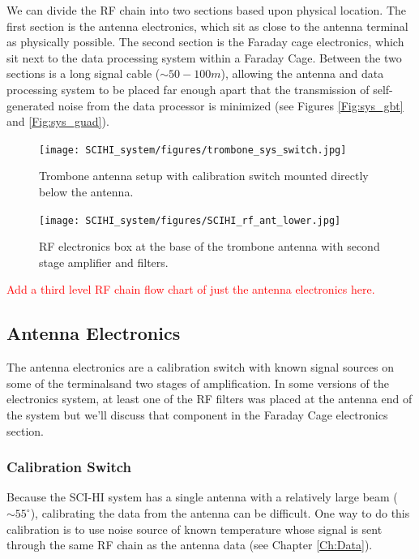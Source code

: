 We can divide the RF chain into two sections based upon physical location. The first section is the antenna electronics, which sit as close to the antenna terminal as physically possible. The second section is the Faraday cage electronics, which sit next to the data processing system within a Faraday Cage. Between the two sections is a long signal cable ($\sim50-100 m$), allowing the antenna and data processing system to be placed far enough apart that the transmission of self-generated noise from the data processor is minimized (see Figures \ref{Fig:sys_gbt} and \ref{Fig:sys_guad}).

\begin{figure}[htb]
\centering
\begin{minipage}[b]{0.47\textwidth}
\centering
\texttt{[image: SCIHI\_system/figures/trombone\_sys\_switch.jpg]}
\caption{Trombone antenna setup with calibration switch mounted directly below the antenna.}
\label{Fig:trombone_switch}
\end{minipage}%
\begin{minipage}[b]{0.02\textwidth}
\hspace{1cm}
\end{minipage}%
\begin{minipage}[b]{0.47\textwidth}
\centering
\texttt{[image: SCIHI\_system/figures/SCIHI\_rf\_ant\_lower.jpg]}
\caption{RF electronics box at the base of the trombone antenna with second stage amplifier and filters.}
\label{Fig:trombone_base}
\end{minipage}
\end{figure}

\textcolor{red}{Add a third level RF chain flow chart of just the antenna electronics here.}

\subsection{Antenna Electronics}
The antenna electronics are a calibration switch with known signal sources on some of the terminalsand two stages of amplification. In some versions of the electronics system, at least one of the RF filters was placed at the antenna end of the system but we'll discuss that component in the Faraday Cage electronics section. 

\subsubsection{Calibration Switch}
Because the SCI-HI system has a single antenna with a relatively large beam ($\sim 55^\circ$), calibrating the data from the antenna can be difficult. One way to do this calibration is to use noise source of known temperature whose signal is sent through the same RF chain as the antenna data (see Chapter \ref{Ch:Data}). 


